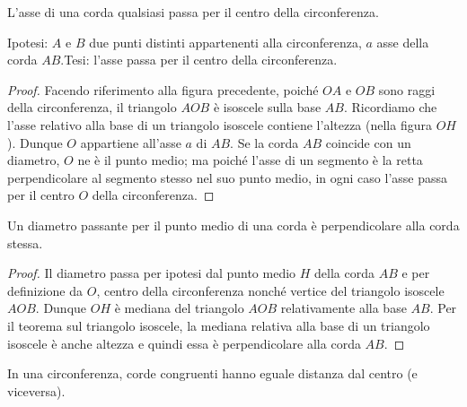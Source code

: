 \begin{teorema}
L'asse di una corda qualsiasi passa per il centro della circonferenza.
\end{teorema}

\noindent Ipotesi: $A$ e $B$ due punti distinti appartenenti alla 
circonferenza, $a$ asse della corda $AB$.\tab Tesi: l'asse passa per 
il centro della circonferenza.

\begin{proof}
Facendo riferimento alla figura precedente, poiché $OA$ e $OB$ sono 
raggi della circonferenza, il triangolo $AOB$ è isoscele sulla base 
$AB$. Ricordiamo che l'asse relativo alla base di un triangolo 
isoscele contiene l'altezza (nella figura $OH$). Dunque $O$ 
appartiene all'asse $a$ di $AB$.
Se la corda $AB$ coincide con un diametro, $O$ ne è il punto medio; 
ma poiché l'asse di un segmento è la retta perpendicolare al segmento 
stesso nel suo punto medio, in ogni caso l'asse passa per il centro 
$O$ della circonferenza.
\end{proof}

\begin{teorema}
Un diametro passante per il punto medio di una corda è perpendicolare 
alla corda stessa.
\end{teorema}

\noindent\begin{minipage}{0.65\textwidth}\parindent15pt
\begin{proof}
Il diametro passa per ipotesi dal punto medio $H$ della corda $AB$ e 
per definizione da $O$, centro della circonferenza nonché vertice del 
triangolo isoscele $AOB$. Dunque $OH$ è mediana del triangolo $AOB$ 
relativamente alla base $AB$. Per il teorema sul triangolo isoscele, 
la mediana relativa alla base di un triangolo isoscele è anche 
altezza e quindi essa è perpendicolare alla corda $AB$.
\end{proof}
\end{minipage}\hfil
\begin{minipage}{0.35\textwidth}
  \centering
\end{minipage}

\begin{teorema}
In una circonferenza, corde congruenti hanno eguale distanza dal 
centro (e viceversa).
\end{teorema}

